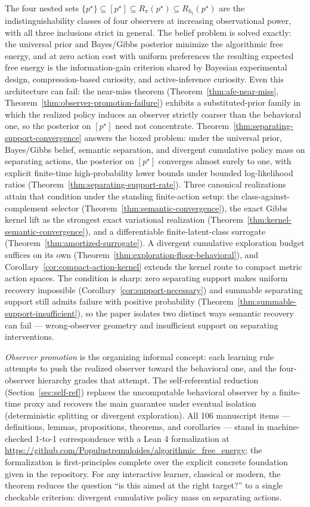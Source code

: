 \documentclass[11pt]{article}
\theoremstyle{definition}
\theoremstyle{remark}
\begin{document}
The four nested sets $\{p^\star\}\subseteq[p^\star]\subseteq R_\pi(p^\star)\subseteq R_{h_t}(p^\star)$ are the indistinguishability classes of four observers at increasing observational power, with all three inclusions strict in general. The belief problem is solved exactly: the universal prior and Bayes/Gibbs posterior minimize the algorithmic free energy, and at zero action cost with uniform preferences the resulting expected free energy is the information-gain criterion shared by Bayesian experimental design, compression-based curiosity, and active-inference curiosity. Even this architecture can fail: the near-miss theorem (Theorem~\ref{thm:afe-near-miss}, Theorem~\ref{thm:observer-promotion-failure}) exhibits a substituted-prior family in which the realized policy induces an observer strictly coarser than the behavioral one, so the posterior on $[p^\star]$ need not concentrate. Theorem~\ref{thm:separating-support-convergence} answers the boxed problem: under the universal prior, Bayes/Gibbs belief, semantic separation, and divergent cumulative policy mass on separating actions, the posterior on $[p^\star]$ converges almost surely to one, with explicit finite-time high-probability lower bounds under bounded log-likelihood ratios (Theorem~\ref{thm:separating-support-rate}). Three canonical realizations attain that condition under the standing finite-action setup: the class-against-complement selector (Theorem~\ref{thm:semantic-convergence}), the exact Gibbs kernel lift as the strongest exact variational realization (Theorem~\ref{thm:kernel-semantic-convergence}), and a differentiable finite-latent-class surrogate (Theorem~\ref{thm:amortized-surrogate}). A divergent cumulative exploration budget suffices on its own (Theorem~\ref{thm:exploration-floor-behavioral}), and Corollary~\ref{cor:compact-action-kernel} extends the kernel route to compact metric action spaces. The condition is sharp: zero separating support makes uniform recovery impossible (Corollary~\ref{cor:support-necessary}) and summable separating support still admits failure with positive probability (Theorem~\ref{thm:summable-support-insufficient}), so the paper isolates two distinct ways semantic recovery can fail --- wrong-observer geometry and insufficient support on separating interventions.

\emph{Observer promotion} is the organizing informal concept: each learning rule attempts to push the realized observer toward the behavioral one, and the four-observer hierarchy grades that attempt. The self-referential reduction (Section~\ref{sec:self-ref}) replaces the uncomputable behavioral observer by a finite-time proxy and recovers the main guarantee under eventual isolation (deterministic splitting or divergent exploration). All 106 manuscript items --- definitions, lemmas, propositions, theorems, and corollaries --- stand in machine-checked 1-to-1 correspondence with a Lean 4 formalization at \url{https://github.com/Populustremuloides/algorithmic_free_energy}; the formalization is first-principles complete over the explicit concrete foundation given in the repository. For any interactive learner, classical or modern, the theorem reduces the question ``is this aimed at the right target?'' to a single checkable criterion: divergent cumulative policy mass on separating actions.



\end{document}
